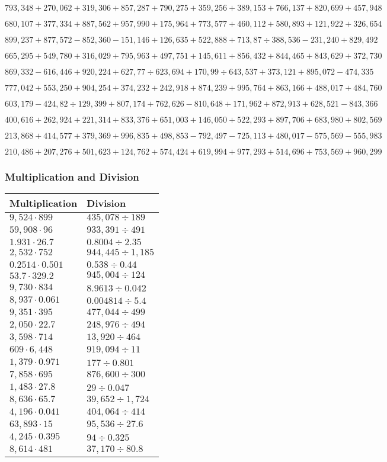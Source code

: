 \(793,348+270,062+319,306+857,287+790,275+359,256+389,153+766,137+820,699+ 457,948\)

\(680,107+377,334+887,562+957,990+175,964+773,577+460,112+580,893+121,922+326,654\)

\(899,237+877,572-852,360-151,146+126,635+522,888+713,87÷388,536-231,240+829,492\)

\(665,295+549,780+316,029+795,963+497,751+145,611+856,432+844,465+843,629+372,730\)

\(869,332-616,446+920,224+627,77÷623,694+170,99÷643,537+373,121+895,072-474,335\)

\(777,042+553,250+904,254+374,232+242,918+874,239+995,764+863,166+488,017+484,760\)

\(603,179-424,82÷129,399+807,174+762,626-810,648+171,962+872,913+628,521-843,366\)

\(400,616+262,924+221,314+833,376+651,003+146,050+522,293+897,706+683,980+802,569\)

\(213,868+414,577+379,369+996,835+498,853-792,497-725,113+480,017-575,569-555,983\)

\(210,486+207,276+501,623+124,762+574,424+619,994+977,293+514,696+753,569+960,299\)

\hypertarget{multiplication-and-division-349}{%
\subsubsection{Multiplication and
Division}\label{multiplication-and-division-349}}

\begin{longtable}[]{@{}ll@{}}
\toprule
Multiplication & Division\tabularnewline
\midrule
\endhead
\(9,524\cdot899\) & \(435,078÷189\)\tabularnewline
\(59,908\cdot96\) & \(933,391÷491\)\tabularnewline
\(1.931\cdot26.7\) & \(0.8004÷2.35\)\tabularnewline
\(2,532\cdot752\) & \(944,445÷1,185\)\tabularnewline
\(0.2514\cdot0.501\) & \(0.538÷0.44\)\tabularnewline
\(53.7\cdot329.2\) & \(945,004÷124\)\tabularnewline
\(9,730\cdot834\) & \(8.9613÷0.042\)\tabularnewline
\(8,937\cdot0.061\) & \(0.004814÷5.4\)\tabularnewline
\(9,351\cdot395\) & \(477,044÷499\)\tabularnewline
\(2,050\cdot22.7\) & \(248,976÷494\)\tabularnewline
\(3,598\cdot714\) & \(13,920÷464\)\tabularnewline
\(609\cdot6,448\) & \(919,094÷11\)\tabularnewline
\(1,379\cdot0.971\) & \(177÷0.801\)\tabularnewline
\(7,858\cdot695\) & \(876,600÷300\)\tabularnewline
\(1,483\cdot27.8\) & \(29÷0.047\)\tabularnewline
\(8,636\cdot65.7\) & \(39,652÷1,724\)\tabularnewline
\(4,196\cdot0.041\) & \(404,064÷414\)\tabularnewline
\(63,893\cdot15\) & \(95,536÷27.6\)\tabularnewline
\(4,245\cdot0.395\) & \(94÷0.325\)\tabularnewline
\(8,614\cdot481\) & \(37,170÷80.8\)\tabularnewline
\bottomrule
\end{longtable}


